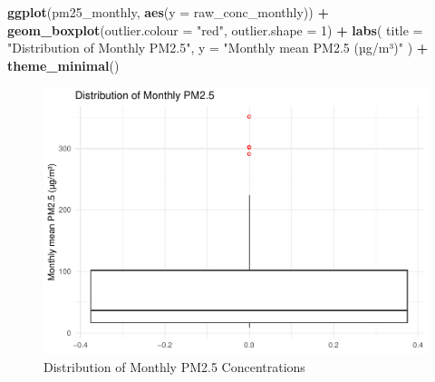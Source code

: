\documentclass[
]{article}
\newenvironment{Shaded}{\begin{snugshade}}{\end{snugshade}}
\newcommand{\AttributeTok}[1]{\textcolor[rgb]{0.13,0.29,0.53}{#1}}
\newcommand{\DecValTok}[1]{\textcolor[rgb]{0.00,0.00,0.81}{#1}}
\newcommand{\FunctionTok}[1]{\textcolor[rgb]{0.13,0.29,0.53}{\textbf{#1}}}
\newcommand{\NormalTok}[1]{#1}
\newcommand{\SpecialCharTok}[1]{\textcolor[rgb]{0.81,0.36,0.00}{\textbf{#1}}}
\newcommand{\StringTok}[1]{\textcolor[rgb]{0.31,0.60,0.02}{#1}}
\begin{document}
\begin{Shaded}
\begin{Highlighting}[]
\FunctionTok{ggplot}\NormalTok{(pm25\_monthly, }\FunctionTok{aes}\NormalTok{(}\AttributeTok{y =}\NormalTok{ raw\_conc\_monthly)) }\SpecialCharTok{+}
  \FunctionTok{geom\_boxplot}\NormalTok{(}\AttributeTok{outlier.colour =} \StringTok{"red"}\NormalTok{, }\AttributeTok{outlier.shape =} \DecValTok{1}\NormalTok{) }\SpecialCharTok{+}
  \FunctionTok{labs}\NormalTok{(}
    \AttributeTok{title =} \StringTok{"Distribution of Monthly PM2.5"}\NormalTok{,}
    \AttributeTok{y =} \StringTok{"Monthly mean PM2.5 (µg/m³)"}
\NormalTok{  ) }\SpecialCharTok{+}
  \FunctionTok{theme\_minimal}\NormalTok{()}
\end{Highlighting}
\end{Shaded}

\begin{figure}
\centering
\includegraphics{Project_Report_files/figure-latex/pm25-monthly-boxplot-1.pdf}
\caption{Distribution of Monthly PM2.5 Concentrations}
\end{figure}
\end{document}
